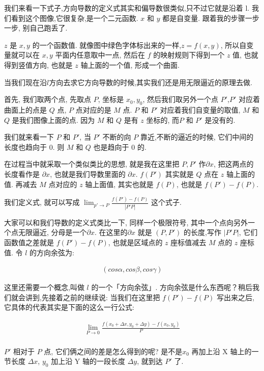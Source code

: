 我们来看一下式子,方向导数的定义式其实和偏导数很类似,只不过它就是沿着 l. 我们看到这个图像,它很复杂,是一个二元函数. $x$ 和 $y$ 都是自变量. 跟着我的步骤一步一步, 别自己跑丢了. 

$z$ 是 $x, y$ 的一个函数值. 就像图中绿色字体标出来的一样,$z = f(x, y)$, 所以自变量就可以在 $x, y$ 平面内任意取中一点, 然后在 $f$ 的映射规则下得到一个 $z$ 值, 也就得到竖值方向, 也就是 $z$ 轴上面的一个值, 形成一个曲面. 

当我们现在沿$l$方向去求它方向导数的时候,其实我们还是用无限逼近的原理去做. 

首先, 我们取两个点, 先取点 $P$, 坐标是 $x_0, y_0$, 然后我们取另外一个点 $P'$,$P'$ 对应着曲面上的点是 $Q$ 点, $P$ 点对应的是 $M$ 点. $P$ 和 $P'$ 对应着我们自变量的取值, $M$ 和$Q$ 是我们图像上面的点. 因为 $M$ 和 $Q$ 是有 $z$ 坐标的, 而$P$ 和 $P'$ 是没有的. 

我们就来看一下 $P$ 和 $P'$, 当 $P'$ 不断的向 $P$ 靠近,不断的逼近的时候, 它们中间的长度也趋向于 0. 则 $M$ 和 $Q$ 也是趋向于 0 的. 

在过程当中就采取一个类似类比的思想, 就是我在这里把 $P, P'$ 作$\partial x$, 把这两点的长度看作是 $\partial x$, 也就是我们导数里面的 $\partial x$.  $f(P')$ 其实就是 $Q$ 点在 $z$ 轴上面的值. 再减去 $M$ 点对应的 $z$ 轴上面值, 其实也就是 $f(P)$, 也就是 $f(P') - f(P)$. 

我们定义式, 就可以写成 $\lim_{p' \to P} \frac{f(P') - f(P)}{|P'P|}$ 这个式子. 

大家可以和我们导数的定义式类比一下, 同样一个极限符号, 其中一个点向另外一个点无限逼近, 分母是一个$\partial x$. 在这里的$\partial x$ 就是 $(P,P')$ 的长度,写作 $|P'P|$, 它们函数值之差就是 $f(P') - f(P)$, 也就是区域点的 $z$ 座标值减去 $M$ 点的 $z$ 座标值. 令 $l$ 的方向余弦为: 

\begin{align*}
  (cos \alpha, cos \beta, cos \gamma)
\end{align*}

这里还需要一个概念,叫做 $l$ 的一个「方向余弦」. 方向余弦是什么东西呢？稍后我们就会讲到,先接着之前的继续说: 当我们在这里把 $f(P') - f(P)$ 写出来之后, 它具体的代表其实是下面的这么一行公式: 

\begin{align*}
  \lim_{P \to 0} \frac{f(x_0 + \Delta x, y_0+\Delta y) - f(x_0, y_0)}{P} \\
\end{align*}

$P'$ 相对于 $P$ 点, 它们俩之间的差是怎么得到的呢? 是不是$x_0$ 再加上沿 X 轴上的一节长度 $\Delta x$, $y_0$ 加上沿 Y 轴的一段长度 $\Delta y$, 就到达 $P'$ 了. 

